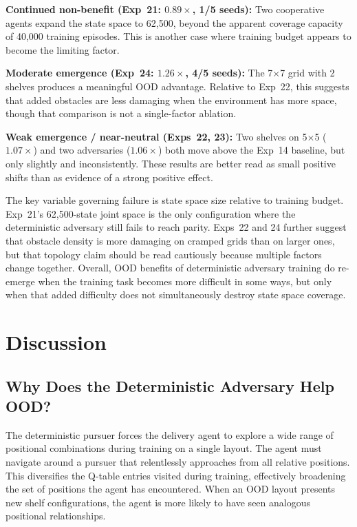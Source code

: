 \documentclass[sigconf]{aamas}
\begin{document}
\textbf{Continued non-benefit (Exp~21: $0.89\times$, 1/5 seeds):} Two
cooperative agents expand the state space to 62{,}500, beyond the apparent
coverage capacity of 40{,}000 training episodes. This is another case
where training budget appears to become the limiting factor.

\textbf{Moderate emergence (Exp~24: $1.26\times$, 4/5 seeds):} The 7$\times$7 grid with
2 shelves produces a meaningful OOD advantage. Relative to Exp~22, this
suggests that added obstacles are less damaging when the environment has more
space, though that comparison is not a single-factor ablation.

\textbf{Weak emergence / near-neutral (Exps~22, 23):} Two shelves on 5$\times$5
($1.07\times$) and two adversaries ($1.06\times$) both move above the Exp~14
baseline, but only slightly and inconsistently. These results are better read
as small positive shifts than as evidence of a strong positive effect.

The key variable governing failure is state space size relative to training
budget. Exp~21's 62{,}500-state joint space is the only configuration where the
deterministic adversary still fails to reach parity. Exps~22 and 24 further
suggest that obstacle density is more damaging on cramped grids than on larger
ones, but that topology claim should be read cautiously because multiple
factors change together. Overall, OOD benefits of deterministic adversary
training do re-emerge when the training task becomes more difficult in some
ways, but only when that added difficulty does not simultaneously destroy state
space coverage.


\section{Discussion}
\label{sec:discussion}
\subsection{Why Does the Deterministic Adversary Help OOD?}

The deterministic pursuer forces the delivery agent to explore a wide range of
positional combinations during training on a single layout. The agent must navigate
around a pursuer that relentlessly approaches from all relative positions. This
diversifies the Q-table entries visited during training, effectively broadening the
set of positions the agent has encountered. When an OOD layout presents new shelf
configurations, the agent is more likely to have seen analogous positional
relationships.
\end{document}
